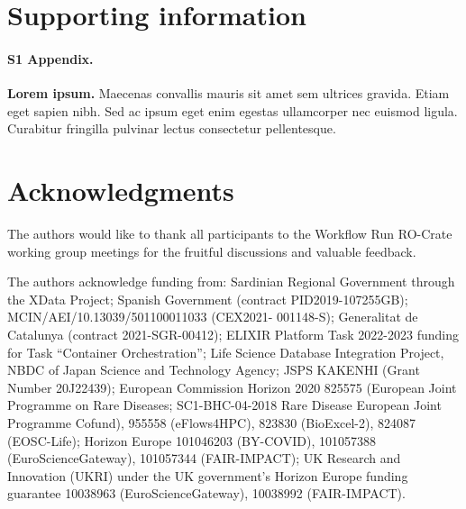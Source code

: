 \documentclass[10pt,letterpaper]{article}
\begin{document}
\section*{Supporting information}



\paragraph*{S1 Appendix.}
\label{S1_Appendix}
{\bf Lorem ipsum.} Maecenas convallis mauris sit amet sem ultrices gravida. Etiam eget sapien nibh. Sed ac ipsum eget enim egestas ullamcorper nec euismod ligula. Curabitur fringilla pulvinar lectus consectetur pellentesque.


\section*{Acknowledgments}

The authors would like to thank all participants to the Workflow Run
RO-Crate working group meetings for the fruitful discussions and
valuable feedback.

The authors acknowledge funding from: 
  Sardinian Regional Government through the XData Project;
  Spanish Government (contract PID2019-107255GB);
  MCIN/AEI/10.13039/501100011033 (CEX2021- 001148-S);
  Generalitat de Catalunya (contract 2021-SGR-00412);
  ELIXIR Platform Task 2022-2023 funding for Task ``Container
  Orchestration'';
  Life Science Database Integration Project, NBDC of Japan Science and
  Technology Agency;
  JSPS KAKENHI (Grant Number 20J22439);
  European Commission Horizon 2020 
  825575 (European Joint Programme on Rare Diseases; SC1-BHC-04-2018 Rare Disease European Joint Programme Cofund),
  955558 (eFlows4HPC),
  823830
  (BioExcel-2), 
  824087
  (EOSC-Life);
  Horizon Europe 
  101046203 (BY-COVID),
  101057388 (EuroScienceGateway),
  101057344 (FAIR-IMPACT);
  UK Research and Innovation (UKRI) under the UK government's Horizon
  Europe funding guarantee 
  10038963 (EuroScienceGateway), 
  10038992 (FAIR-IMPACT).
\end{document}
